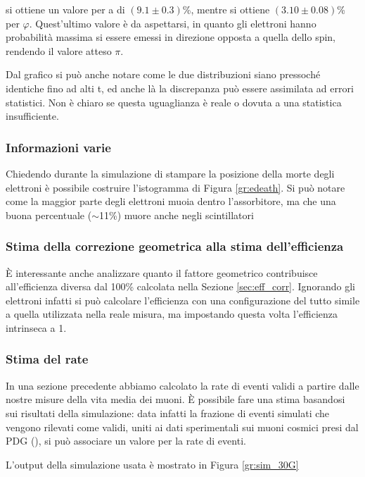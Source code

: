 si ottiene un valore per a di $(9.1 \pm 0.3)$\%, mentre si ottiene $(3.10 \pm 0.08)$\% per $\varphi$. Quest'ultimo valore \`e da aspettarsi, in quanto gli elettroni hanno probabilit\`a massima si essere emessi in direzione opposta a quella dello spin, rendendo il valore atteso $\pi$.

Dal grafico si pu\`o anche notare come le due distribuzioni siano pressoch\'e identiche fino ad alti t, ed anche l\`a la discrepanza pu\`o essere assimilata ad errori statistici. Non \`e chiaro se questa uguaglianza \`e reale o dovuta a una statistica insufficiente.

\subsubsection{Informazioni varie}
Chiedendo durante la simulazione di stampare la posizione della morte degli elettroni \`e possibile costruire l'istogramma di Figura \ref{gr:edeath}. Si pu\`o notare come la maggior parte degli elettroni muoia dentro l'assorbitore, ma che una buona percentuale ($\sim$11\%) muore anche negli scintillatori


\subsubsection{Stima della correzione geometrica alla stima dell'efficienza}
\`E interessante anche analizzare quanto il fattore geometrico contribuisce all'efficienza diversa dal 100\% calcolata nella Sezione \ref{sec:eff_corr}. Ignorando gli elettroni infatti si pu\`o calcolare l'efficienza con una configurazione del tutto simile a quella utilizzata nella reale misura, ma impostando questa volta l'efficienza intrinseca a 1.

\subsubsection{Stima del rate}
In una sezione precedente abbiamo calcolato la rate di eventi validi a partire dalle nostre misure della vita media dei muoni. 
\`E possibile fare una stima basandosi sui risultati della simulazione: data infatti la frazione di eventi simulati che vengono rilevati come validi, uniti ai dati sperimentali sui muoni cosmici presi dal PDG (\cite{bib:Patrignani:2016xqp}), si pu\`o associare un valore per la rate di eventi.

L'output della simulazione usata \`e mostrato in Figura \ref{gr:sim_30G}

